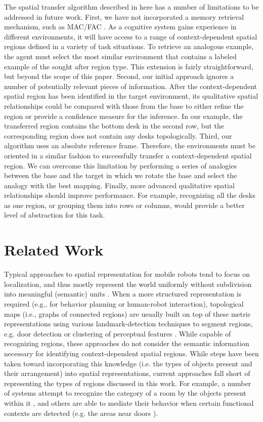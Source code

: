 \documentclass[letterpaper]{article}
\begin{document}
The spatial transfer algorithm described in here has a number of limitations to be addressed in future work.  First, we have not incorporated a memory retrieval mechanism, such as MAC/FAC \cite{forbus/etal1995}.  As a cognitive system gains experience in different environments, it will have access to a range of context-dependent spatial regions defined in a variety of task situations. To retrieve an analogous example, the agent must select the most similar environment that contains a labeled example of the sought after region type. This extension is fairly straightforward, but beyond the scope of this paper. Second, our initial approach ignores a number of potentially relevant pieces of information. After the context-dependent spatial region has been identified in the target environment, its qualitative spatial relationships could be compared with those from the base to either refine the region or provide a confidence measure for the inference. In our example, the transferred region contains the bottom desk in the second row, but the corresponding region does not contain any desks topologically. Third, our algorithm uses an absolute reference frame. Therefore, the environments must be oriented in a similar fashion to successfully transfer a context-dependent spatial region. We can overcome this limitation by performing a series of analogies between the base and the target in which we rotate the base and select the analogy with the best mapping. Finally, more advanced qualitative spatial relationships should improve performance. For example, recognizing all the desks as one region, or grouping them into rows or columns, would provide a better level of abstraction for this task.

\section{Related Work}

Typical approaches to spatial representation for mobile robots tend to focus on localization, and thus mostly represent the world uniformly without subdivision into meaningful (semantic) units \cite{Thrun02a}. When a more structured representation is required (e.g., for behavior planning or human-robot interaction), topological maps (i.e., graphs of connected regions) are usually built on top of these metric representations using various landmark-detection techniques to segment regions, e.g. door detection \cite{Hawes/etal:2009b} or clustering of perceptual features \cite{Peltason/etal:2009a}. While capable of recognizing regions, these approaches do not consider the semantic information necessary for identifying context-dependent spatial regions. While steps have been taken toward incorporating this knowledge  (i.e. the types of objects present and their arrangement) into spatial representations, current approaches fall short of representing the types of regions discussed in this work. For example, a number of systems attempt to recognize the category of a room by the objects present within it \cite{Hawes/etal:2010b}, and others are able to mediate their behavior when certain functional contexts are detected (e.g. the areas near doors \cite{Zender2008a}).
\end{document}
